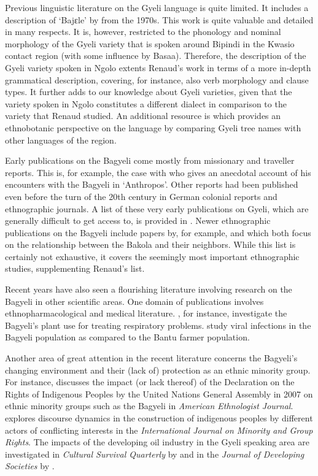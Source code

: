 Previous linguistic literature on the Gyeli language is quite limited. It includes a description of `Bajɛle' by \citet{renaud76} from the 1970s. This work is quite valuable and detailed in many respects. It is, however, restricted to the phonology and nominal morphology of the Gyeli variety that is spoken around Bipindi in the Kwasio contact region (with some influence by Basaa).
Therefore, the description of the Gyeli variety spoken in Ngolo extents Renaud's work in terms of a more in-depth grammatical description, covering, for instance, also verb morphology and clause types. It further adds to our knowledge about Gyeli varieties, given that the variety spoken in Ngolo constitutes a different dialect in comparison to the variety that Renaud studied. 
An additional resource is   \citet{letouzey75} which provides an ethnobotanic perspective on the language by comparing Gyeli tree names with other languages of the region.

Early publications on the Bagyeli  come mostly from missionary and traveller reports. This is, for example, the case with \citet{seiwert26} who gives an anecdotal account of his encounters with the Bagyeli in `Anthropos'. Other reports had been published even before the turn of the 20th century in German colonial reports and ethnographic journals. A list of these very early publications on Gyeli, which are generally difficult to get access to, is provided in \citet[357-360]{renaud76}. 
Newer ethnographic publications on the Bagyeli include papers by, for example, \citet{joiris94} and \citet{ngima2001} which both focus on the relationship between the Bakola and their neighbors. 
While this list is certainly not exhaustive, it covers the seemingly most important ethnographic studies, supplementing Renaud's list.

Recent years have also seen a flourishing literature involving research on the Bagyeli in other scientific areas. One domain of publications involves ethnopharmacological and medical literature. \citet{fomogne2014},  for instance, investigate the Bagyeli's plant use for treating respiratory problems.  \citet{mauclere2011} study viral infections in the Bagyeli population as compared to the Bantu farmer population.

Another area of great attention in the recent literature concerns  the Bagyeli's changing environment and their (lack of) protection as an ethnic minority group. For instance, \citet{pelican2009} discusses the impact (or lack thereof) of the Declaration on the Rights of Indigenous Peoples by the United Nations General Assembly in 2007 on ethnic minority groups such as the Bagyeli in {\itshape American Ethnologist Journal}. \citet{germond2012} explores discourse dynamics in the construction of indigenous peoples by different actors of conflicting interests in the {\itshape International Journal on Minority and Group Rights}. The impacts of the developing oil industry in the Gyeli speaking area are investigated in {\itshape Cultural Survival Quarterly} by \citet{nelson2004} and in the {\itshape Journal of Developing Societies} by \citet{swing2012}. 

